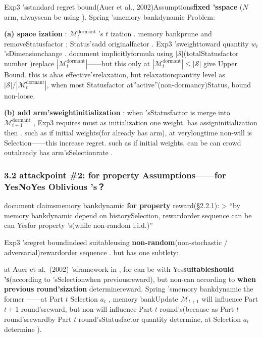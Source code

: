 \documentclass[
  12pt,
]{article}
\begin{document}
Exp3 'sstandard regret bound(Auer et al., 2002)Assumptions\textbf{fixed 'sspace }(\(N\)
arm, alwayscan be using ). Spring 'smemory bankdynamic Problem: 

\textbf{(a) space ization }: \(\mathcal{M}_t^{\text{dormant}}\)
's \(t\) ization . memory bankprune and removeStatusfactor ; Status'sadd originalfactor . Exp3
'sweighttoward quantity  \(w_t\) 'sDimensionchange . document implicitlyformula using 
\(|\mathcal{S}|\)(totalStatusfactor number )replace
\(|\mathcal{M}_t^{\text{dormant}}|\)------but this only at 
\(|\mathcal{M}_t^{\text{dormant}}| \leq |\mathcal{S}|\)
give Upper Bound. this is ahas effective'srelaxation, but relaxationquantity level as 
\(|\mathcal{S}| / |\mathcal{M}_t^{\text{dormant}}|\), when most Statusfactor at''active''(non-dormancy)Status, bound non-loose. 

\textbf{(b) add arm'sweightinitialization }: when 'sStatusfactor is merge into
\(\mathcal{M}_{t+1}^{\text{dormant}}\) , Exp3
requires must as initialization one weight. has assigninitialization then . such as if initial weights(for already has arm), at verylongtime non-will is Selection------this increase regret. such as if initial weights, can be can crowd outalready has arm'sSelectionrate . 

\subsubsection{3.2 attackpoint  \#2: for property Assumptions------for YesNoYes Oblivious
's？}\label{ux653bux51fbux70b9-2ux5bf9ux6297ux6027ux5047ux8bbeux5bf9ux624bux662fux5426ux662f-oblivious-ux7684}

document claimsmemory bankdynamic \textbf{for property }reward(§2.2.1): \textgreater{}
``by memory bankdynamic depend on historySelection, rewardorder sequence can be can Yesfor property 's(while non-random
i.i.d.)''

Exp3 'sregret boundindeed suitableusing \textbf{non-random}(non-stochastic /
adversarial)rewardorder sequence . but has one subtlety: 

at  Auer et al.~(2002)
'sframework in , for can be with Yes\textbf{suitableshould 's}(according to 'sSelectionwhen previousreward), but non-can according to \textbf{when previous round'sization }determinereward. Spring
'smemory bankdynamic the former ------at Part \(t\) Selection \(a_t\) , memory bankUpdate
\(\mathcal{M}_{t+1}\) will influence Part \(t+1\) round'sreward, but non-will influence Part \(t\)
round's(because as Part \(t\) round'srewardby Part \(t\) round'sStatusfactor quantity determine, at Selection
\(a_t\) determine ). 
\end{document}
